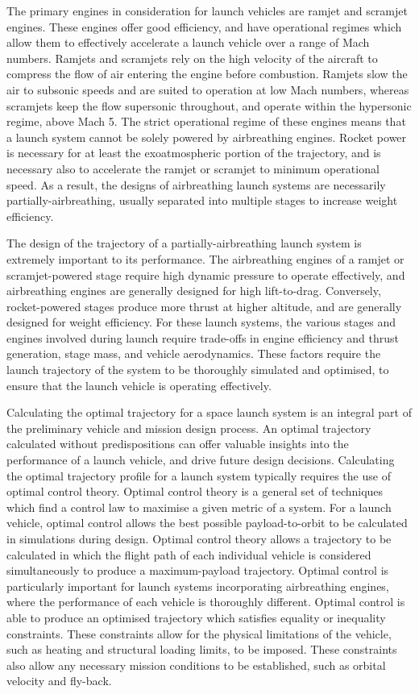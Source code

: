  	The primary engines in consideration for launch vehicles are ramjet and scramjet engines. These engines offer good efficiency, and have operational regimes which allow them to effectively accelerate a launch vehicle over a range of Mach numbers. 
  	Ramjets and scramjets rely on the high velocity of the aircraft to compress the flow of air entering the engine before combustion.  Ramjets slow the air to subsonic speeds and are suited to operation at low Mach numbers, whereas scramjets keep the flow supersonic throughout, and operate within the hypersonic regime, above Mach 5. 
  	The strict operational regime of these engines means that a launch system cannot be solely powered by airbreathing engines. Rocket power is necessary for at least the exoatmospheric portion of the trajectory, and is necessary also to accelerate the ramjet or scramjet to minimum operational speed.
  	As a result, the designs of airbreathing launch systems are necessarily partially-airbreathing, usually separated into multiple stages to increase weight efficiency. 
  	 
  	 The design of the trajectory of a partially-airbreathing launch system is extremely important to its performance. 
  	   The airbreathing engines of a ramjet or scramjet-powered stage require high dynamic pressure to operate effectively, and airbreathing engines are generally designed for high lift-to-drag. Conversely, rocket-powered stages produce more thrust at higher altitude, and are generally designed for weight efficiency. For these launch systems, the various stages and engines involved during launch require trade-offs in engine efficiency and thrust generation, stage mass, and vehicle aerodynamics. These factors require the launch trajectory of the system to be thoroughly simulated and optimised, to ensure that the launch vehicle is operating effectively. 
 	  

  Calculating the optimal trajectory for a space launch system is an integral part of the preliminary vehicle and mission design process. An optimal trajectory calculated without predispositions can offer valuable insights into the performance of a launch vehicle, and drive future design decisions. Calculating the optimal trajectory profile for a launch system typically requires the use of optimal control theory. Optimal control theory is a general set of techniques which find a control law to maximise a given metric of a system. For a launch vehicle, optimal control allows the best possible payload-to-orbit to be calculated in simulations during design. 
Optimal control theory allows a trajectory to be calculated in which the flight path of each individual vehicle is considered simultaneously to produce a maximum-payload trajectory. 
Optimal control is particularly important for launch systems incorporating airbreathing engines, where the performance of each vehicle is thoroughly different. 
Optimal control is able to produce an optimised trajectory which satisfies equality or inequality constraints. These constraints allow for the physical limitations of the vehicle, such as heating and structural loading limits, to be imposed. These constraints also allow any necessary mission conditions to be established, such as orbital velocity and fly-back. 
  
